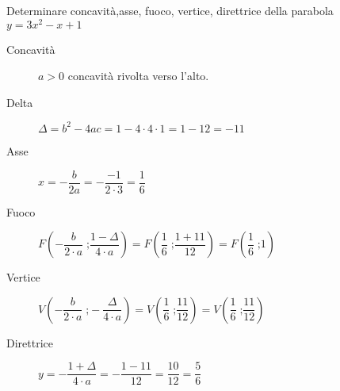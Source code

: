 	Determinare concavità,asse, fuoco, vertice, direttrice della parabola $y=3x^2-x+1$
		\begin{description}
			\item[Concavità] $a>0$ concavità rivolta verso l'alto.
			\item[Delta] $\Delta=b^2-4ac=1-4\cdot 4\cdot 1=1-12=-11$
			\item[Asse] $x=-\dfrac{b}{2a}=-\dfrac{-1}{2\cdot 3}=\dfrac{1}{6}$
			\item[Fuoco] $F\left(-\dfrac{b}{2\cdot a}\;\text{;}\dfrac{1-\Delta}{4\cdot a}\right)=F\left(\dfrac{1}{6}\;\text{;}\dfrac{1+11}{12}\right)=F\left(\dfrac{1}{6}\;\text{;} 1\right)$
			\item[Vertice] $V\left(-\dfrac{b}{2\cdot a}\;\text{;}-\dfrac{\Delta}{4\cdot a}\right)=V\left(\dfrac{1}{6}\;\text{;}\dfrac{11}{12}\right)=V\left(\dfrac{1}{6}\;\text{;} \dfrac{11}{12}\right)$
			\item[Direttrice] $y=-\dfrac{1+\Delta}{4\cdot a}=-\dfrac{1-11}{12}=\dfrac{10}{12}=\dfrac{5}{6}$
		\end{description}
%		
